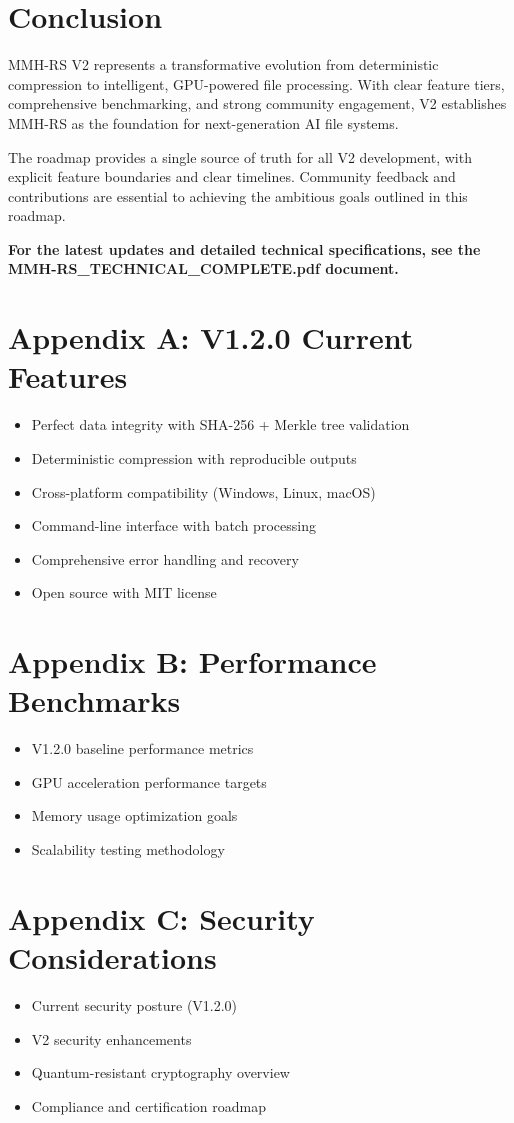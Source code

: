 \documentclass[12pt,a4paper]{article}
\begin{document}
\section{Conclusion}

MMH-RS V2 represents a transformative evolution from deterministic compression to intelligent, GPU-powered file processing. With clear feature tiers, comprehensive benchmarking, and strong community engagement, V2 establishes MMH-RS as the foundation for next-generation AI file systems.

The roadmap provides a single source of truth for all V2 development, with explicit feature boundaries and clear timelines. Community feedback and contributions are essential to achieving the ambitious goals outlined in this roadmap.

\textbf{For the latest updates and detailed technical specifications, see the MMH-RS\_TECHNICAL\_COMPLETE.pdf document.}

\appendix

\section{Appendix A: V1.2.0 Current Features}
\begin{itemize}
    \item Perfect data integrity with SHA-256 + Merkle tree validation
    \item Deterministic compression with reproducible outputs
    \item Cross-platform compatibility (Windows, Linux, macOS)
    \item Command-line interface with batch processing
    \item Comprehensive error handling and recovery
    \item Open source with MIT license
\end{itemize}

\section{Appendix B: Performance Benchmarks}
\begin{itemize}
    \item V1.2.0 baseline performance metrics
    \item GPU acceleration performance targets
    \item Memory usage optimization goals
    \item Scalability testing methodology
\end{itemize}

\section{Appendix C: Security Considerations}
\begin{itemize}
    \item Current security posture (V1.2.0)
    \item V2 security enhancements
    \item Quantum-resistant cryptography overview
    \item Compliance and certification roadmap
\end{itemize}
\end{document}
